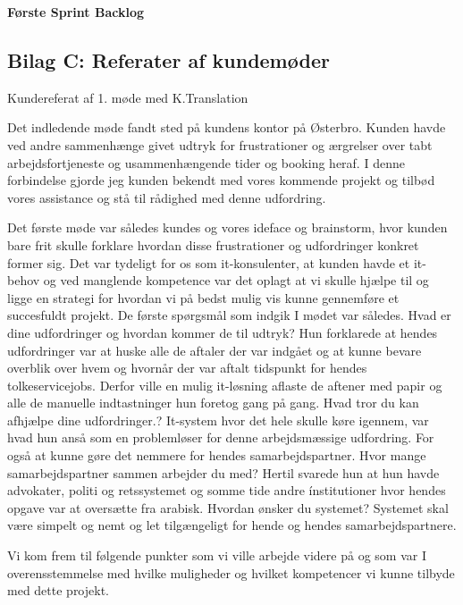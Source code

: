 \documentclass[12pt]{article}   %
\begin{document}
\begin{center}
\textbf{Første Sprint Backlog}
\end{center}

\vspace{0.5cm}

\newpage



\subsection{Bilag C: Referater af kundemøder}

Kundereferat af 1. møde med K.Translation 

Det indledende møde fandt sted på kundens kontor på Østerbro. Kunden havde ved andre sammenhænge givet udtryk for frustrationer og ærgrelser over tabt arbejdsfortjeneste og usammenhængende tider og booking heraf. I denne forbindelse gjorde jeg kunden bekendt med vores  kommende projekt og tilbød vores assistance og stå til rådighed med denne udfordring. 

Det første møde var således kundes og vores ideface og brainstorm, hvor kunden bare frit skulle forklare hvordan disse frustrationer og udfordringer konkret former sig. Det var tydeligt for os som it-konsulenter, at kunden havde et it-behov og ved manglende kompetence var det oplagt at vi skulle hjælpe til og ligge en strategi for hvordan vi på bedst mulig vis kunne gennemføre et succesfuldt projekt. De første spørgsmål som indgik I mødet var således. Hvad er dine udfordringer og hvordan kommer de til udtryk? Hun forklarede at hendes udfordringer var at huske alle de aftaler der var indgået og at kunne bevare overblik over hvem og hvornår der var aftalt tidspunkt for hendes tolkeservicejobs. Derfor ville en mulig it-løsning aflaste de aftener med papir og alle de manuelle indtastninger hun foretog gang på gang.  Hvad tror du kan afhjælpe dine udfordringer.? It-system hvor det hele skulle køre igennem, var hvad hun anså som en problemløser for denne arbejdsmæssige udfordring. For også at kunne gøre det nemmere for hendes samarbejdspartner. Hvor mange samarbejdspartner sammen arbejder du med? Hertil svarede hun at hun havde advokater, politi og retssystemet og somme tide andre ínstitutioner hvor hendes opgave var at oversætte fra arabisk. Hvordan ønsker du systemet? Systemet skal være simpelt og nemt og let tilgængeligt for hende og hendes samarbejdspartnere. 

Vi kom frem til følgende punkter som vi ville arbejde videre på og som var I overensstemmelse med hvilke muligheder og hvilket kompetencer vi kunne tilbyde med dette projekt.  
\end{document}
